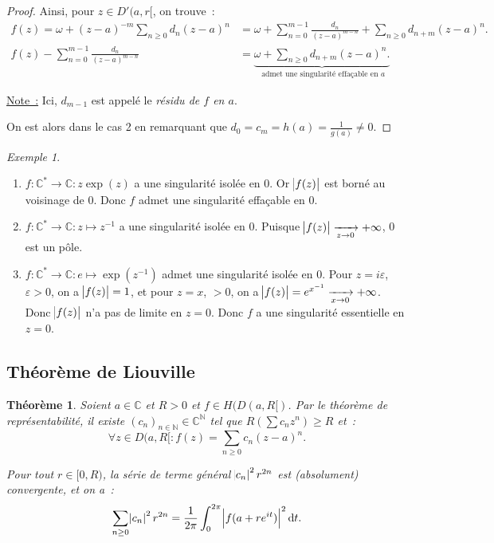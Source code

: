 \documentclass{report}
\newtheorem{thm}{Théorème}[chapter]
\theoremstyle{definition}
\theoremstyle{remark}
\newtheorem{ex}{Exemple}[chapter]
\numberwithin{equation}{section}
\newcommand{\C}{\mathbb C}
\newcommand{\N}{\mathbb N}
\newcommand{\pinfty}{{+\infty}}
\begin{document}
\begin{proof}
			Ainsi, pour $z \in D'(a, r[$, on trouve~:
			\begin{align}
				f(z) = \omega + (z-a)^{-m}\sum_{n \geq 0}d_n(z-a)^n &= \omega + \sum_{n=0}^{m-1}\frac {d_n}{(z-a)^{m-n}} + \sum_{n \geq 0}d_{n+m}(z-a)^n. \\
				f(z) - \sum_{n=0}^{m-1}\frac {d_n}{(z-a)^{m-n}} &= \underbrace {\omega + \sum_{n \geq 0}d_{n+m}(z-a)^n.}_{\text{ admet une singularité effaçable en $a$}}
			\end{align}

			\underline{Note~:} Ici, $d_{m-1}$ est appelé le \textit{résidu de $f$ en $a$}.

			On est alors dans le cas 2 en remarquant que $d_0 = c_m = h(a) = \frac 1{g(a)} \neq 0$.
			\end{proof}

			\begin{ex}~
			\begin{enumerate}
				\item $f : \C^* \to \C : z \exp(z)$ a une singularité isolée en $0$. Or $\abs {f(z)}$ est borné au voisinage de $0$. Donc $f$ admet une singularité
				effaçable en $0$.
				\item $f : \C^* \to \C : z \mapsto z^{-1}$ a une singularité isolée en $0$. Puisque $\abs {f(z)} \xrightarrow[z \to 0]{} \pinfty$, $0$ est un pôle.
				\item $f : \C^* \to \C : e \mapsto \exp(z^{-1})$ admet une singularité isolée en $0$. Pour $z = i\varepsilon$, $\varepsilon > 0$, on a $\abs {f(z)} = 1$,
				et pour $z = x$, $ > 0$, on a $\abs {f(z)} = e^{x^{-1}} \xrightarrow[x \to 0]{} \pinfty$. Donc $\abs {f(z)}$ n'a pas de limite en $z=0$. Donc $f$ a une
				singularité essentielle en $z=0$.
			\end{enumerate}
			\end{ex}

		\subsection{Théorème de Liouville}
			\begin{thm}\label{thm:pré-Liouville} Soient $a \in \C$ et $R > 0$ et $f \in H(D(a, R[)$. Par le théorème de représentabilité, il existe
			$(c_n)_{n \in \N} \in \C^\N$ tel que $R(\sum c_nz^n) \geq R$ et~:
			\begin{equation}
				\forall z \in D(a, R[ : f(z) = \sum_{n \geq 0}c_n(z-a)^n.
			\end{equation}

			Pour tout $r \in [0, R)$, la série de terme général $\abs {c_n}^2r^{2n}$ est (absolument) convergente, et on a~:
			\begin{equation}
				\sum_{n \geq 0}\abs {c_n}^2r^{2n} = \frac 1{2\pi}\int_0^{2\pi}\abs {f(a+re^{it})}^2\dif t.
			\end{equation}
			\end{thm}
\end{document}
